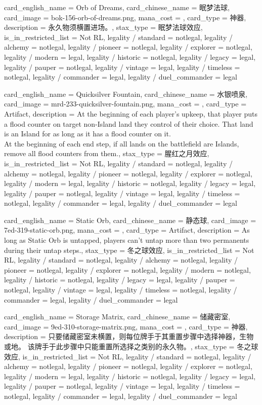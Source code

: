 \documentclass[lang = cn, color = black, 10pt]{AllThatStax}
\begin{document}
\card
{
	card_english_name = {Orb of Dreams},
	card_chinese_name = {眠梦法球},
	card_image = bok-156-orb-of-dreams.png,
	mana_cost = ,
	card_type = 神器,
	description = {永久物须横置进场。},
	stax_type = 眠梦法球效应,
	is_in_restricted_list = Not RL,
	legality / standard = notlegal,
	legality / alchemy = notlegal,
	legality / pioneer = notlegal,
	legality / explorer = notlegal,
	legality / modern = legal,
	legality / historic = notlegal,
	legality / legacy = legal,
	legality / pauper = notlegal,
	legality / vintage = legal,
	legality / timeless = notlegal,
	legality / commander = legal,
	legality / duel_commander = legal
}

\card
{
	card_english_name = {Quicksilver Fountain},
	card_chinese_name = {水银喷泉},
	card_image = mrd-233-quicksilver-fountain.png,
	mana_cost = ,
	card_type = Artifact,
	description = {At the beginning of each player's upkeep, that player puts a flood counter on target non-Island land they control of their choice. That land is an Island for as long as it has a flood counter on it.\\
		At the beginning of each end step, if all lands on the battlefield are Islands, remove all flood counters from them.},
	stax_type = 腥红之月效应,
	is_in_restricted_list = Not RL,
	legality / standard = notlegal,
	legality / alchemy = notlegal,
	legality / pioneer = notlegal,
	legality / explorer = notlegal,
	legality / modern = legal,
	legality / historic = notlegal,
	legality / legacy = legal,
	legality / pauper = notlegal,
	legality / vintage = legal,
	legality / timeless = notlegal,
	legality / commander = legal,
	legality / duel_commander = legal
}

\card
{
	card_english_name = {Static Orb},
	card_chinese_name = {静态球},
	card_image = 7ed-319-static-orb.png,
	mana_cost = ,
	card_type = Artifact,
	description = {As long as Static Orb is untapped, players can't untap more than two permanents during their untap steps.},
	stax_type = 冬之球效应,
	is_in_restricted_list = Not RL,
	legality / standard = notlegal,
	legality / alchemy = notlegal,
	legality / pioneer = notlegal,
	legality / explorer = notlegal,
	legality / modern = notlegal,
	legality / historic = notlegal,
	legality / legacy = legal,
	legality / pauper = notlegal,
	legality / vintage = legal,
	legality / timeless = notlegal,
	legality / commander = legal,
	legality / duel_commander = legal
}

\card
{
	card_english_name = {Storage Matrix},
	card_chinese_name = {储藏密室},
	card_image = 9ed-310-storage-matrix.png,
	mana_cost = ,
	card_type = 神器,
	description = {只要储藏密室未横置，则每位牌手于其重置步骤中选择神器，生物或地。 该牌手于此步骤中只能重置所选择之类别的永久物。},
	stax_type = 冬之球效应,
	is_in_restricted_list = Not RL,
	legality / standard = notlegal,
	legality / alchemy = notlegal,
	legality / pioneer = notlegal,
	legality / explorer = notlegal,
	legality / modern = legal,
	legality / historic = notlegal,
	legality / legacy = legal,
	legality / pauper = notlegal,
	legality / vintage = legal,
	legality / timeless = notlegal,
	legality / commander = legal,
	legality / duel_commander = legal
}
\end{document}
